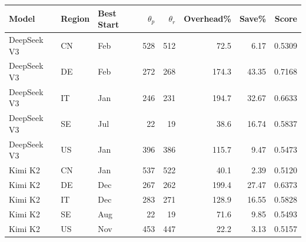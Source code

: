 \begin{tabular}{lllrrrrr}
\toprule
Model & Region & Best Start & $\theta_p$ & $\theta_r$ & Overhead\% & Save\% & Score \\
\midrule
DeepSeek V3 & CN & Feb & 528 & 512 & 72.5 & 6.17 & 0.5309 \\
DeepSeek V3 & DE & Feb & 272 & 268 & 174.3 & 43.35 & 0.7168 \\
DeepSeek V3 & IT & Jan & 246 & 231 & 194.7 & 32.67 & 0.6633 \\
DeepSeek V3 & SE & Jul & 22 & 19 & 38.6 & 16.74 & 0.5837 \\
DeepSeek V3 & US & Jan & 396 & 386 & 115.7 & 9.47 & 0.5473 \\
Kimi K2 & CN & Jan & 537 & 522 & 40.1 & 2.39 & 0.5120 \\
Kimi K2 & DE & Dec & 267 & 262 & 199.4 & 27.47 & 0.6373 \\
Kimi K2 & IT & Dec & 283 & 271 & 128.9 & 16.55 & 0.5828 \\
Kimi K2 & SE & Aug & 22 & 19 & 71.6 & 9.85 & 0.5493 \\
Kimi K2 & US & Nov & 453 & 447 & 22.2 & 3.13 & 0.5157 \\
\bottomrule
\end{tabular}
